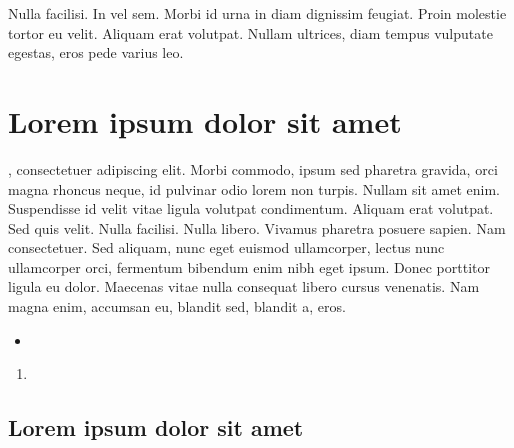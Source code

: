 \begin{savequote}[85mm]
  \small{Nulla facilisi. In vel sem. Morbi id urna in diam dignissim feugiat. Proin molestie tortor eu velit. Aliquam erat volutpat. Nullam ultrices, diam tempus vulputate egestas, eros pede varius leo.
  }
\end{savequote}

\chapter{Lorem ipsum dolor sit amet}
    \label{chap:capitulo3}

, consectetuer adipiscing elit. Morbi commodo, ipsum sed pharetra gravida, orci magna rhoncus neque, id pulvinar odio lorem non turpis. Nullam sit amet enim. Suspendisse id velit vitae ligula volutpat condimentum. Aliquam erat volutpat. Sed quis velit. Nulla facilisi. Nulla libero. Vivamus pharetra posuere sapien. Nam consectetuer. Sed aliquam, nunc eget euismod ullamcorper, lectus nunc ullamcorper orci, fermentum bibendum enim nibh eget ipsum. Donec porttitor ligula eu dolor. Maecenas vitae nulla consequat libero cursus venenatis. Nam magna enim, accumsan eu, blandit sed, blandit a, eros.

\begin{itemize}
  \item \lipsum[2]
\end{itemize}

\lipsum[3]

\begin{enumerate}
  \item \lipsum[4]
\end{enumerate}

\lipsum[17]

\section{Lorem ipsum dolor sit amet}

\lipsum[17]


